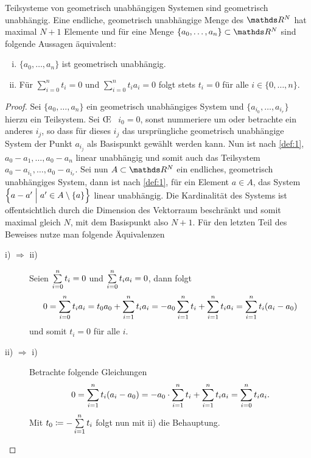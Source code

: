 \begin{Lem}\label{lem:1}
  Teilsysteme von geometrisch unabhängigen Systemen sind geometrisch
  unabhängig. Eine endliche, geometrisch unabhängige Menge des $\R^N$
  hat maximal $N+1$ Elemente und für eine Menge
  $\{ a_0 , \ldots , a_n \} \subset \R^N$ sind folgende Aussagen
  äquivalent:

  \begin{enumerate}[(i)]
  \item $\{ a_0 , \ldots , a_n \}$ ist geometrisch unabhängig.
  \item Für $\sum\limits_{i=0}^n t_i = 0$ und
    $\sum\limits_{i=0}^n t_i a_i = 0$ folgt stets $t_i = 0$ für alle
    $i \in \{ 0,\ldots,n\}$.
  \end{enumerate}

  \begin{proof}
    Sei $\{ a_0 , \ldots , a_n \}$ ein geometrisch unabhängiges System
    und $\{ a_{i_0},\ldots,a_{i_r} \}$ hierzu ein Teilsystem.  Sei
    \OE~ $i_0 = 0$, sonst nummeriere um oder betrachte ein anderes
    $i_j$, so dass für dieses $i_j$ das ursprüngliche geometrisch
    unabhängige System der Punkt $a_{i_j}$ als Basispunkt gewählt
    werden kann. Nun ist nach \cref{def:1},
    $ a_0 - a_1 , \ldots , a_0 - a_n$ linear unabhängig und somit auch
    das Teilsystem $ a_0 - a_ {i_1}, \ldots , a_0 - a_{i_r}$.  Sei nun
    $A \subset \R^N$ ein endliches, geometrisch unabhängiges System,
    dann ist nach \cref{def:1}, für ein Element $a \in A$, das System
    $\set{ a - a'}{a' \in A \setminus \sset{a} }$ linear unabhängig.
    Die Kardinalität des Systems ist offentsichtlich durch die
    Dimension des Vektorraum beschränkt und somit maximal gleich $N$,
    mit dem Basispunkt also $N+1$. Für den letzten Teil des Beweises
    nutze man folgende Äquivalenzen

    \begin{description}
    \item[i) $\Rightarrow$ ii)] Seien $\sp{0}{n} t_i = 0$ und $\sp{0}{n} t_i
      a_i = 0$, dann folgt 
      \begin{gather*}
        0 = \sp{0}{n} t_i a_i = t_0 a_0 + \sp{1}{n} t_i a_i = -a_0
        \sp{1}{n} t_i + \sp{1}{n} t_i a_i = \sp{1}{n} t_i (a_i - a_0)
    \end{gather*}
    und somit $t_i = 0$ für alle $i$.
      \item[ii) $\Rightarrow$ i)] Betrachte folgende Gleichungen
        \begin{gather*}
          0 = \sp{1}{n} t_i (a_i - a_0) = -a_0 \cdot \sp{1}{n} t_i 
          + \sp{1}{n} t_i a_i = \sp{0}{n} t_i a_i.
        \end{gather*}
        Mit $t_0 \coloneqq - \sp{1}{n} t_i$ folgt nun mit ii) die
        Behauptung.
    \end{description}\nopagebreak
  \end{proof}
\end{Lem}

